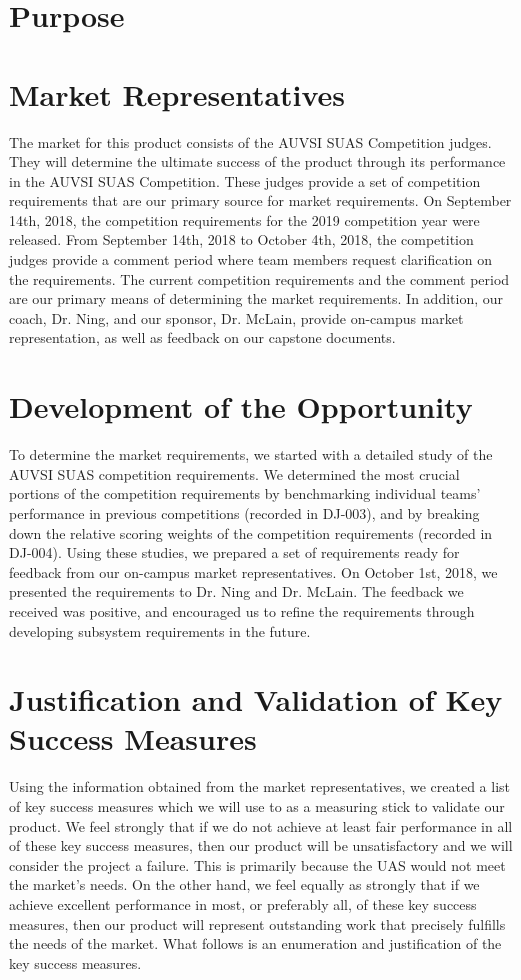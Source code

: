 \documentclass[]{auvsi_doc}
\begin{document}
\CapstoneTitlePage

\section{Purpose}
\section{Market Representatives}
The market for this product consists of the AUVSI SUAS Competition judges.
They will determine the ultimate success of the product through its performance in the AUVSI SUAS Competition.
These judges provide a set of competition requirements that are our primary source for market requirements.
On September 14th, 2018, the competition requirements for the 2019 competition year were released.
From September 14th, 2018 to October 4th, 2018, the competition judges provide a comment period where team members request clarification on the requirements.
The current competition requirements and the comment period are our primary means of determining the market requirements.
In addition, our coach, Dr. Ning, and our sponsor, Dr. McLain, provide on-campus market representation, as well as feedback on our capstone documents. 

\section{Development of the Opportunity}

To determine the market requirements, we started with a detailed study of the AUVSI SUAS competition requirements.
We determined the most crucial portions of the competition requirements by benchmarking individual teams' performance in previous competitions (recorded in DJ-003), and by breaking down the relative scoring weights of the competition requirements (recorded in DJ-004). 
Using these studies, we prepared a set of requirements ready for feedback from our on-campus market representatives.
On October 1st, 2018, we presented the requirements to Dr. Ning and Dr. McLain.
The feedback we received was positive, and encouraged us to refine the requirements through developing subsystem requirements in the future.

\section{Justification and Validation of Key Success Measures}
Using the information obtained from the market representatives, we created a list of key success measures which we will use to as a measuring stick to validate our product. We feel strongly that if we do not achieve at least fair performance in all of these key success measures, then our product will be unsatisfactory and we will consider the project a failure. This is primarily because the UAS would not meet the market's needs. On the other hand, we feel equally as strongly that if we achieve excellent performance in most, or preferably all, of these key success measures, then our product will represent outstanding work that precisely fulfills the needs of the market. What follows is an enumeration and justification of the key success measures. 
\end{document}
